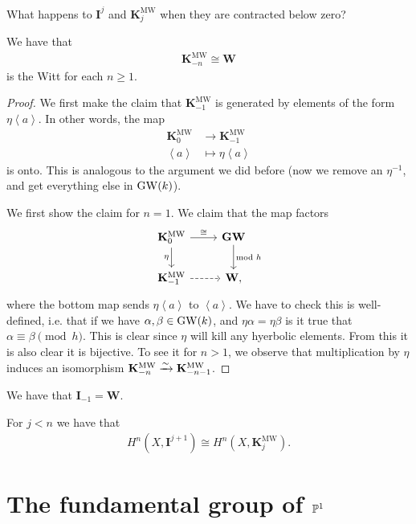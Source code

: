\documentclass[11pt,openany]{book}
\providecommand{\KMW}{\mathbf{K}^\mathrm{MW}}
\begin{document}
What happens to $\mathbf{I}^j$ and $\KMW_j$ when they are contracted below zero?

\begin{proposition} We have that
\begin{align*}
    \KMW_{-n} \cong \mathbf{W}
\end{align*}
is the Witt for each $n \ge 1$.
\end{proposition}
\begin{proof} We first make the claim that $\KMW_{-1}$ is generated by elements of the form $\eta \left\langle a \right\rangle$. In other words, the map
\begin{align*}
    \KMW_0 &\to \KMW_{-1} \\
    \left\langle a \right\rangle &\mapsto \eta \left\langle a \right\rangle
\end{align*}
is onto. This is analogous to the argument we did before (now we remove an $\eta^{-1}$, and get everything else in $\GW(k)$).


We first show the claim for $n=1$. We claim that the map factors
\[ \begin{tikzcd}
    \KMW_0\rar["\cong"]\dar["\eta" left] & \mathbf{GW}\dar["\text{mod }h" right]\\
    \KMW_{-1}\rar[dashed] & \mathbf{W},
\end{tikzcd} \]
where the bottom map sends $\eta \left\langle a \right\rangle$ to $\left\langle a \right\rangle$.
We have to check this is well-defined, i.e. that if we have $\alpha,\beta\in \GW(k)$, and $\eta \alpha = \eta\beta$ is it true that $\alpha \equiv \beta \pmod{h}$. This is clear since $\eta$ will kill any hyerbolic elements. From this it is also clear it is bijective. To see it for $n > 1$, we observe that multiplication by $\eta$ induces an isomorphism $\KMW_{-n}\xto{\sim} \KMW_{-n-1}$.
\end{proof}

\begin{corollary} We have that $\mathbf{I}_{-1} = \mathbf{W}$.
\end{corollary}


\begin{corollary} For $j<n$ we have that
\begin{align*}
    H^n(X, \mathbf{I}^{j+1}) \cong H^n(X, \KMW_j).
\end{align*}
\end{corollary}



\section{The fundamental group of $\P^1$}
\end{document}
